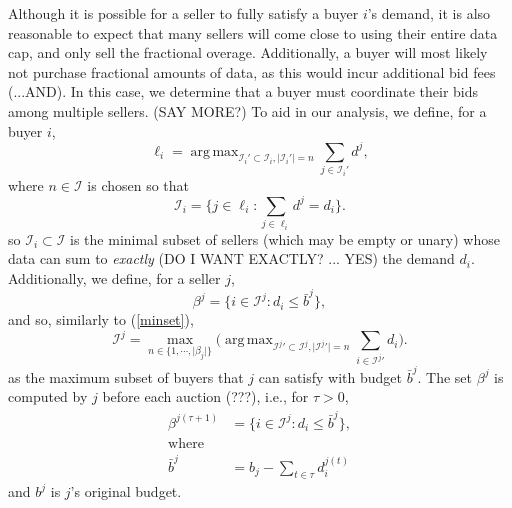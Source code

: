 \documentclass[12pt]{article}
\theoremstyle{definition}
\newcommand{\mcI}{\mathcal{I}}
\DeclareMathOperator*{\argmax}{arg\,max}
\begin{document}
\begin{multicols}{2}
Although it is possible for a seller to fully satisfy a buyer $i$'s demand, it
is also reasonable to expect that many sellers will come close to using their
entire data cap, and only sell the fractional overage. Additionally, a buyer
will most likely not purchase fractional amounts of data, as this would incur
additional bid fees (...AND). In this case, we
determine that a buyer must coordinate their bids among multiple sellers. (SAY
MORE?) To aid in our analysis, we define, for a buyer $i$,
$$
    \ell_i =\argmax_{\mcI_i' \subset \mcI_i, \vert\mcI_i'\vert =
n}\sum_{j\in\mcI_i'} d^j,
$$
where $n\in\mcI$ is chosen so that
\begin{equation}\label{minset}
    \mcI_i = \bigg\lbrace j \in  \ell_i:
\displaystyle\sum_{j\in \ell_i} d^j = d_i \bigg\rbrace.
\end{equation} 
so $\mcI_i \subset \mcI$ is the
minimal subset of sellers (which may be empty or unary) whose data can sum to \emph{exactly}
(DO I WANT EXACTLY? ... YES) the demand $d_i$.
Additionally, we define, for a seller $j$,
$$
    \beta^j = \bigg\lbrace i\in\mcI^j: 
d_i \le \bar{b}^j \bigg\rbrace,
$$
and so, similarly to (\ref{minset}),
\begin{equation}\label{maxset}
    \mcI^j = \max_{n\in\lbrace 1,\cdots, \vert \beta_j\vert\rbrace}\bigg(\argmax_{{\mcI^j}' \subset \mcI^j,
\vert{\mcI^j}'\vert = n}\sum_{i\in{\mcI^j}'} d_i\bigg).
\end{equation}
as the maximum subset of buyers that $j$ can satisfy with budget
$\bar{b}^j$. The set $\beta^j$ is computed by $j$ before each auction (???),
i.e., for $\tau >0$, 
\begin{align*}
    \beta^{j(\tau+1)} &= \bigg\lbrace i\in\mcI^j: 
        d_i \le \bar{b}^j \bigg\rbrace, \\
    \text{where}&\\
    \bar{b}^j &= b_j - \sum_{t\in
\tau} d_i^{j(t)}
\end{align*}
and $b^j$ is $j$'s original budget.


\end{multicols}
\end{document}
